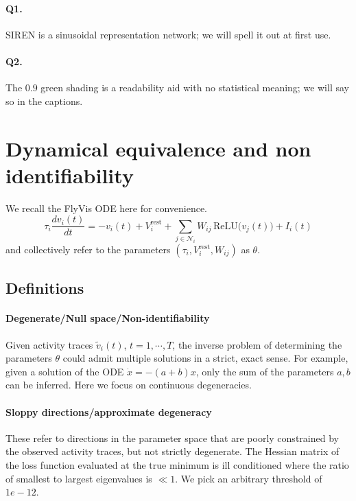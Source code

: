 \documentclass[11pt]{article}
\begin{document}
\paragraph{Q1.} SIREN is a sinusoidal representation network; we will spell it
out at first use.

\paragraph{Q2.} The $0.9$ green shading is a readability aid with no statistical
meaning; we will say so in the captions.

\section{Dynamical equivalence and non identifiability}

We recall the FlyVis ODE here for convenience.
\begin{equation}
    \tau_i\frac{dv_i(t)}{dt} = -v_i(t) + V^{\mathrm{rest}}_i
+ \sum_{j\in\mathcal{N}_i} W_{ij}\,\text{ReLU}\!\big(v_j(t)\big)
+ I_i(t) \label{eq:Flyvis-app-noise-free-ode}
\end{equation}
and collectively refer to the parameters $(\tau_i, V^{\mathrm{rest}}_i, W_{ij})$ as $\theta$.

\subsection{Definitions}

\paragraph{Degenerate/Null space/Non-identifiability}
Given activity traces $\tilde{v}_i(t)$, $t=1, \cdots, T$, the inverse problem of determining the parameters $\theta$ could admit multiple solutions in a strict, exact sense. For example, given a solution of the ODE $\dot{x} = - (a+b)x$, only the sum of the parameters $a, b$ can be inferred. Here we focus on continuous degeneracies.

\paragraph{Sloppy directions/approximate degeneracy}
These refer to directions in the parameter space that are poorly constrained by the observed activity traces, but not strictly degenerate. The Hessian matrix of the loss function evaluated at the true minimum is ill conditioned where the ratio of smallest to largest eigenvalues is $\ll 1$. We pick an arbitrary threshold of $1e-12$.
\end{document}
